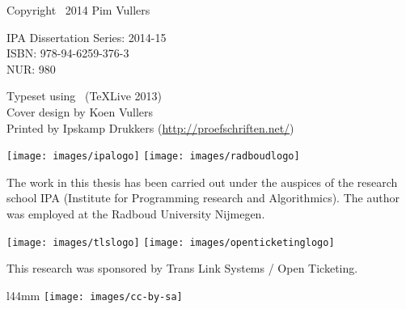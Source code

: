 \thispagestyle{empty}

\noindent
Copyright \textcopyright\ 2014 Pim Vullers \\\null

\noindent
IPA Dissertation Series: 2014-15 \\
ISBN: 978-94-6259-376-3 \\
NUR: 980 \\\null

\noindent 
Typeset using \LaTeXe\ (\TeX Live 2013) \\
Cover design by Koen Vullers \\
Printed by Ipskamp Drukkers (\url{http://proefschriften.net/}) \\\null

\vspace{35mm}

\begin{center}
\texttt{[image: images/ipalogo]}
\qquad
\texttt{[image: images/radboudlogo]}
\end{center}

\noindent
The work in this thesis has been carried out under the auspices of the research school IPA (Institute for Programming research and Algorithmics).
The author was employed at the Radboud University Nijmegen.

\vspace{20mm}

\begin{center}
\texttt{[image: images/tlslogo]}
\qquad
\texttt{[image: images/openticketinglogo]}
\end{center}

\noindent 
This research was sponsored by Trans Link Systems / Open Ticketing.

\vspace{20mm}

\begin{wrapfigure}{l}{44mm}
  \vspace{-4.7mm}
  \texttt{[image: images/cc-by-sa]}
\end{wrapfigure}

